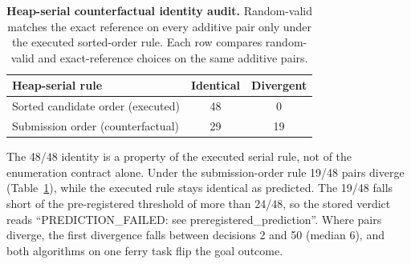 \begin{table}[t]
\caption{\textbf{Heap-serial counterfactual identity audit.} Random-valid matches the exact reference on every additive pair only under the executed sorted-order rule. Each row compares random-valid and exact-reference choices on the same additive pairs.}
\label{tab:appendix-counterfactual}
\centering\footnotesize
\setlength{\tabcolsep}{4pt}
\begin{tabular}{lcc}
\toprule[0.4mm]
\rowcolor{mygray}\textbf{Heap-serial rule} & \textbf{Identical} & \textbf{Divergent} \\
\midrule
Sorted candidate order (executed) & 48 & 0 \\
Submission order (counterfactual) & 29 & 19 \\
\bottomrule
\end{tabular}
\end{table}

The 48/48 identity is a property of the executed serial rule, not of the enumeration contract alone. Under the submission-order rule 19/48 pairs diverge (Table~\ref{tab:appendix-counterfactual}), while the executed rule stays identical as predicted. The 19/48 falls short of the pre-registered threshold of more than 24/48, so the stored verdict reads ``PREDICTION\_FAILED: see preregistered\_prediction''. Where pairs diverge, the first divergence falls between decisions 2 and 50 (median 6), and both algorithms on one ferry task flip the goal outcome.

